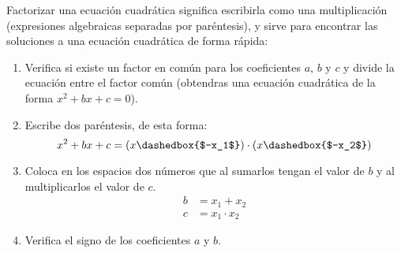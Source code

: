 \begin{tcolorbox}[
        colback=colorrds!5!white,
        colframe=colorrds!35!white,
        coltitle=black,
        fonttitle=\bfseries,
        center title,
        title=Factiorización de una ecuación cuadrática]
    Factorizar una ecuación cuadrática significa escribirla como una multiplicación (expresiones algebraicas separadas por paréntesis), y sirve para encontrar las soluciones a una ecuación cuadrática de forma rápida:
    \begin{enumerate}
        \item Verifica si existe un factor en común para los coeficientes $a$, $b$ y $c$ y divide la ecuación entre el factor común (obtendras una ecuación cuadrática de la forma $x^2+bx+c=0$).
        \item Escribe dos paréntesis, de esta forma:
              \[ x^2+bx+c = \left(x \dashedbox{$-x_1$}\right)\cdot\left(x \dashedbox{$-x_2$}\right)                  \]
        \item Coloca en los espacios dos números que al sumarlos tengan el valor de $b$ y al multiplicarlos el valor de $c$.
              \[
                  \begin{array}{rl}
                      b & = x_1 + x_2     \\
                      c & = x_1 \cdot x_2
                  \end{array}
              \]
        \item Verifica el signo de los coeficientes $a$ y $b$.
    \end{enumerate}
\end{tcolorbox}
